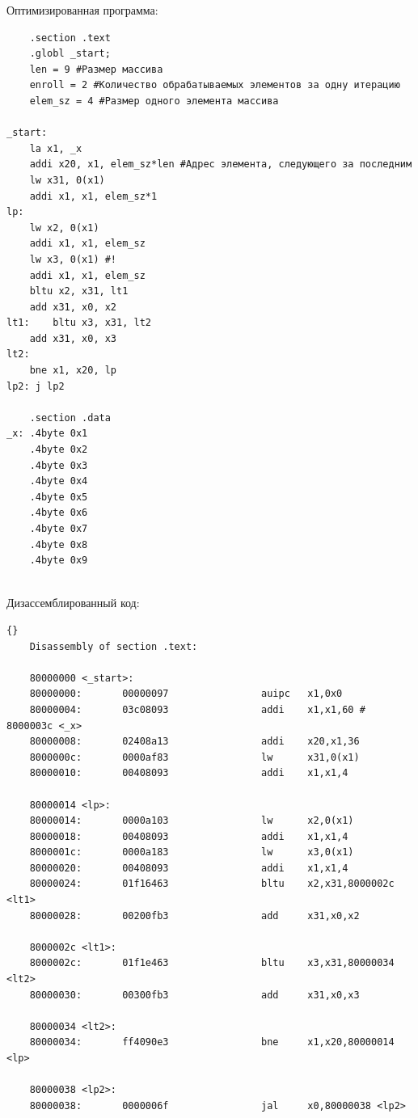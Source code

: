 Оптимизированная программа:
\begin{lstlisting}
    .section .text
    .globl _start;
    len = 9 #Размер массива
    enroll = 2 #Количество обрабатываемых элементов за одну итерацию
    elem_sz = 4 #Размер одного элемента массива

_start:
    la x1, _x
    addi x20, x1, elem_sz*len #Адрес элемента, следующего за последним
    lw x31, 0(x1)
    addi x1, x1, elem_sz*1
lp:
    lw x2, 0(x1)
    addi x1, x1, elem_sz
    lw x3, 0(x1) #!
    addi x1, x1, elem_sz
    bltu x2, x31, lt1
    add x31, x0, x2
lt1:    bltu x3, x31, lt2
    add x31, x0, x3 
lt2:
    bne x1, x20, lp
lp2: j lp2

    .section .data
_x: .4byte 0x1
    .4byte 0x2
    .4byte 0x3
    .4byte 0x4
    .4byte 0x5
    .4byte 0x6
    .4byte 0x7
    .4byte 0x8
    .4byte 0x9
    
\end{lstlisting}

\clearpage

Дизассемблированный код:
\begin{lstlisting}{}
    Disassembly of section .text:
    
    80000000 <_start>:
    80000000:       00000097                auipc   x1,0x0
    80000004:       03c08093                addi    x1,x1,60 # 8000003c <_x>
    80000008:       02408a13                addi    x20,x1,36
    8000000c:       0000af83                lw      x31,0(x1)
    80000010:       00408093                addi    x1,x1,4
    
    80000014 <lp>:
    80000014:       0000a103                lw      x2,0(x1)
    80000018:       00408093                addi    x1,x1,4
    8000001c:       0000a183                lw      x3,0(x1)
    80000020:       00408093                addi    x1,x1,4
    80000024:       01f16463                bltu    x2,x31,8000002c <lt1>
    80000028:       00200fb3                add     x31,x0,x2
    
    8000002c <lt1>:
    8000002c:       01f1e463                bltu    x3,x31,80000034 <lt2>
    80000030:       00300fb3                add     x31,x0,x3
    
    80000034 <lt2>:
    80000034:       ff4090e3                bne     x1,x20,80000014 <lp>
    
    80000038 <lp2>:
    80000038:       0000006f                jal     x0,80000038 <lp2>
\end{lstlisting}

\clearpage

